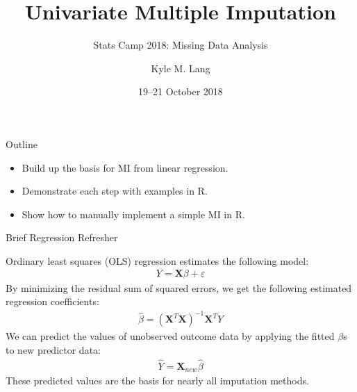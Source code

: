 \documentclass{beamer}\usepackage[]{graphicx}\usepackage[]{color}
\title{Univariate Multiple Imputation}
\subtitle{Stats Camp 2018: Missing Data Analysis}
\author{Kyle M. Lang}
\institute{Department of Methodology \& Statistics\\Tilburg University}
\date{19--21 October 2018}
\begin{document}




\begin{frame}[t,plain]

  \titlepage

\end{frame}


\begin{frame}{Outline}
  
  \begin{itemize}
  \item Build up the basis for MI from linear regression.
  \item Demonstrate each step with examples in R.
  \item Show how to manually implement a simple MI in R.
  \end{itemize}
  
\end{frame}


\begin{frame}{Brief Regression Refresher}
  
  Ordinary least squares (OLS) regression estimates the following model:
  \begin{align*}
    Y = \mathbf{X}\beta + \varepsilon
  \end{align*}
  By minimizing the residual sum of squared errors, we get the following 
  estimated regression coefficients:
  \begin{align*}
     \hat{\beta} = \left(\mathbf{X}^T \mathbf{X} \right)^{-1} \mathbf{X}^T Y
  \end{align*}
  We can predict the values of unobserved outcome data by applying the fitted 
  $\beta$s to new predictor data:
  \begin{align*}
    \hat{Y} = \mathbf{X}_{new}\hat{\beta}
  \end{align*}
  These predicted values are the basis for nearly all imputation methods.
  
\end{frame}

\watermarkoff %
\end{document}
